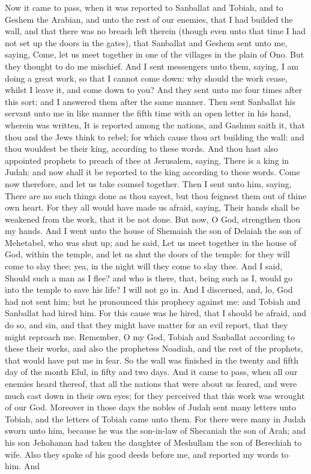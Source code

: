 Now it came to pass, when it was reported to Sanballat and Tobiah, and to Geshem the Arabian, and unto the rest of our enemies, that I had builded the wall, and that there was no breach left therein (though even unto that time I had not set up the doors in the gates), that Sanballat and Geshem sent unto me, saying, Come, let us meet together in one of the villages in the plain of Ono. But they thought to do me mischief. And I sent messengers unto them, saying, I am doing a great work, so that I cannot come down: why should the work cease, whilst I leave it, and come down to you? And they sent unto me four times after this sort; and I answered them after the same manner. Then sent Sanballat his servant unto me in like manner the fifth time with an open letter in his hand, wherein was written, It is reported among the nations, and Gashmu saith it, that thou and the Jews think to rebel; for which cause thou art building the wall: and thou wouldest be their king, according to these words. And thou hast also appointed prophets to preach of thee at Jerusalem, saying, There is a king in Judah: and now shall it be reported to the king according to these words. Come now therefore, and let us take counsel together. Then I sent unto him, saying, There are no such things done as thou sayest, but thou feignest them out of thine own heart. For they all would have made us afraid, saying, Their hands shall be weakened from the work, that it be not done. But now, O God, strengthen thou my hands.  And I went unto the house of Shemaiah the son of Delaiah the son of Mehetabel, who was shut up; and he said, Let us meet together in the house of God, within the temple, and let us shut the doors of the temple: for they will come to slay thee; yea, in the night will they come to slay thee. And I said, Should such a man as I flee? and who is there, that, being such as I, would go into the temple to save his life? I will not go in. And I discerned, and, lo, God had not sent him; but he pronounced this prophecy against me: and Tobiah and Sanballat had hired him. For this cause was he hired, that I should be afraid, and do so, and sin, and that they might have matter for an evil report, that they might reproach me. Remember, O my God, Tobiah and Sanballat according to these their works, and also the prophetess Noadiah, and the rest of the prophets, that would have put me in fear.  So the wall was finished in the twenty and fifth day of the month Elul, in fifty and two days. And it came to pass, when all our enemies heard thereof, that all the nations that were about us feared, and were much cast down in their own eyes; for they perceived that this work was wrought of our God. Moreover in those days the nobles of Judah sent many letters unto Tobiah, and the letters of Tobiah came unto them. For there were many in Judah sworn unto him, because he was the son-in-law of Shecaniah the son of Arah; and his son Jehohanan had taken the daughter of Meshullam the son of Berechiah to wife. Also they spake of his good deeds before me, and reported my words to him. And 
